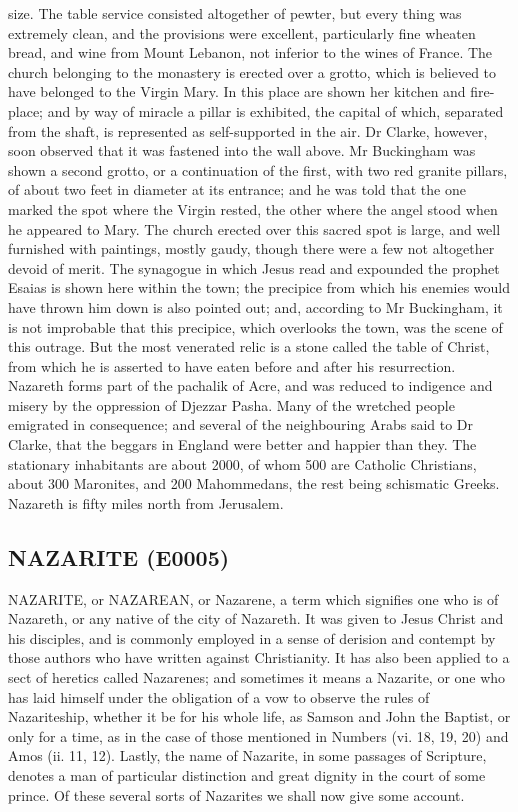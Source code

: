 \documentclass{article}
\begin{document}
size. The table service consisted altogether of pewter, but every thing was extremely clean, and the provisions were excellent, particularly fine wheaten bread, and wine from Mount Lebanon, not inferior to the wines of France. The church belonging to the monastery is erected over a grotto, which is believed to have belonged to the Virgin Mary. In this place are shown her kitchen and fire-place; and by way of miracle a pillar is exhibited, the capital of which, separated from the shaft, is represented as self-supported in the air. Dr Clarke, however, soon observed that it was fastened into the wall above. Mr Buckingham was shown a second grotto, or a continuation of the first, with two red granite pillars, of about two feet in diameter at its entrance; and he was told that the one marked the spot where the Virgin rested, the other where the angel stood when he appeared to Mary. The church erected over this sacred spot is large, and well furnished with paintings, mostly gaudy, though there were a few not altogether devoid of merit. The synagogue in which Jesus read and expounded the prophet Esaias is shown here within the town; the precipice from which his enemies would have thrown him down is also pointed out; and, according to Mr Buckingham, it is not improbable that this precipice, which overlooks the town, was the scene of this outrage. But the most venerated relic is a stone called the table of Christ, from which he is asserted to have eaten before and after his resurrection. Nazareth forms part of the pachalik of Acre, and was reduced to indigence and misery by the oppression of Djezzar Pasha. Many of the wretched people emigrated in consequence; and several of the neighbouring Arabs said to Dr Clarke, that the beggars in England were better and happier than they. The stationary inhabitants are about 2000, of whom 500 are Catholic Christians, about 300 Maronites, and 200 Mahommedans, the rest being schismatic Greeks. Nazareth is fifty miles north from Jerusalem.

\subsection*{NAZARITE (E0005)}
NAZARITE, or NAZAREAN, or Nazarene, a term which signifies one who is of Nazareth, or any native of the city of Nazareth. It was given to Jesus Christ and his disciples, and is commonly employed in a sense of derision and contempt by those authors who have written against Christianity. It has also been applied to a sect of heretics called Nazarenes; and sometimes it means a Nazarite, or one who has laid himself under the obligation of a vow to observe the rules of Nazariteship, whether it be for his whole life, as Samson and John the Baptist, or only for a time, as in the case of those mentioned in Numbers (vi. 18, 19, 20) and Amos (ii. 11, 12). Lastly, the name of Nazarite, in some passages of Scripture, denotes a man of particular distinction and great dignity in the court of some prince. Of these several sorts of Nazarites we shall now give some account.
\end{document}
